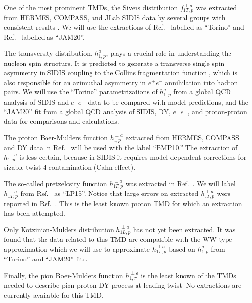 \documentclass[a4paper]{article}
\begin{document}
One of the most prominent TMDs, the Sivers distribution $f_{1T,p}^{\perp a}$
was extracted from HERMES, COMPASS, and JLab SIDIS data by several groups 
with consistent results
\cite{Anselmino:2010bs,Anselmino:2005ea,Anselmino:2005an,Collins:2005ie,Vogelsang:2005cs,Anselmino:2008sga,Bacchetta:2011gx,Anselmino:2011gs,Echevarria:2014xaa,Cammarota:2020qcw,Bacchetta:2020gko}. We will use the extractions of 
Ref.~\cite{Anselmino:2011gs} labelled as ``Torino'' and
Ref.~\cite{Cammarota:2020qcw} labelled as ``JAM20''. 

The transversity distribution, $h_{1,p}^a$, plays a crucial role in
understanding the nucleon spin structure. It is predicted to generate a transverse single spin
asymmetry in SIDIS coupling to the Collins fragmentation function
\cite{Collins:1992kk}, which is also responsible for an azimuthal asymmetry  in $e^+e^-$ annihilation into hadron pairs. 
We will use the ``Torino'' parametrizations of $h_{1,p}^a$
from a  global QCD analysis of SIDIS and $e^+e^-$ data
\cite{Anselmino:2013vqa} to be compared with model predictions, 
and the ``JAM20'' fit from a global QCD analysis of SIDIS, DY,
$e^+e^-$, and proton-proton data \cite{Cammarota:2020qcw} for 
comparisons and calculations. 

The proton Boer-Mulders function $h_{1,p}^{\perp a}$
extracted from HERMES, COMPASS and DY data
in Ref.~\cite{Barone:2009hw} will be used with the label
``BMP10.'' The extraction of $h_{1,p}^{\perp a}$
\cite{Barone:2009hw} is less certain, because 
in SIDIS it requires model-dependent corrections 
for sizable twist-4 contamination (Cahn effect).

The so-called pretzelosity function $h_{1T,p}^{\perp a}$  was extracted 
in Ref.~\cite{Lefky:2014eia}. We will label $h_{1T,p}^{\perp a}$  from Ref.~\cite{Lefky:2014eia} as ``LP15''. 
Notice that large errors on extracted $h_{1T,p}^{\perp a}$ were 
reported in Ref.~\cite{Lefky:2014eia}. 
This is the least known proton TMD for which an extraction has been attempted.

Only Kotzinian-Mulders distribution $h_{1L,p}^{\perp a}$ has not 
yet been extracted. It was found that the data related to this TMD \cite{Airapetian:1999tv,Jawalkar:2017ube,Parsamyan:2018evv} 
are compatible with the WW-type approximation
\cite{Bastami:2018xqd} which we will use to approximate
$h_{1L,p}^{\perp a}$  based on $h_{1,p}^a$ 
from ``Torino'' \cite{Anselmino:2013vqa} and ``JAM20'' \cite{Cammarota:2020qcw} fits.

Finally, the pion Boer-Mulders function  $h_{1,\pi}^{\perp a}$ 
is the least known of the TMDs needed to describe pion-proton
DY process at leading twist. No extractions  
are currently available for this TMD.
\end{document}

